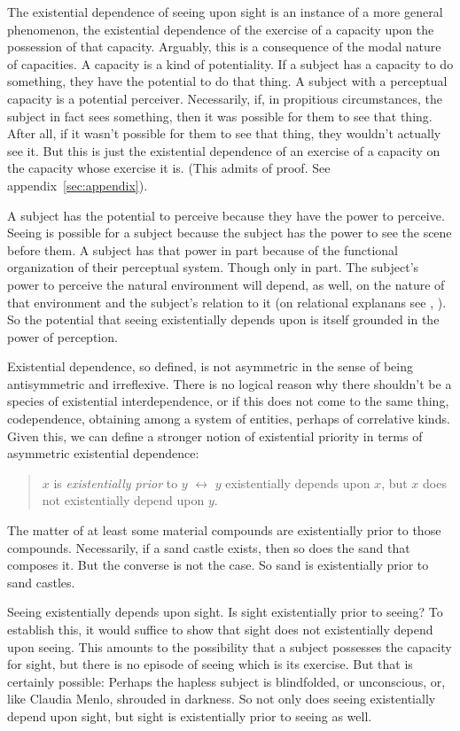 \documentclass[12pt]{article}
\begin{document}
The existential dependence of seeing upon sight is an instance of a more general phenomenon, the existential dependence of the exercise of a capacity upon the possession of that capacity. Arguably, this is a consequence of the modal nature of capacities. A capacity is a kind of potentiality. If a subject has a capacity to do something, they have the potential to do that thing. A subject with a perceptual capacity is a potential perceiver. Necessarily, if, in propitious circumstances, the subject in fact sees something, then it was possible for them to see that thing. After all, if it wasn't possible for them to see that thing, they wouldn't actually see it. But this is just the existential dependence of an exercise of a capacity on the capacity whose exercise it is. (This admits of proof. See appendix~\ref{sec:appendix}).

A subject has the potential to perceive because they have the power to perceive. Seeing is possible for a subject because the subject has the power to see the scene before them. A subject has that power in part because of the functional organization of their perceptual system. Though only in part. The subject's power to perceive the natural environment will depend, as well, on the nature of that environment and the subject's relation to it (on relational explanans see \citealt{Peacocke:1993kx}, \citealt{Williamson:2000lr}). So the potential that seeing existentially depends upon is itself grounded in the power of perception.

Existential dependence, so defined, is not asymmetric in the sense of being antisymmetric and irreflexive. There is no logical reason why there shouldn't be a species of existential interdependence, or if this does not come to the same thing, codependence, obtaining among a system of entities, perhaps of correlative kinds. Given this, we can define a stronger notion of existential priority in terms of asymmetric existential dependence:
\begin{quote}
    \( x \) is \emph{existentially prior} to \( y \) \( \leftrightarrow \) \( y \) existentially depends upon \( x \), but \( x \) does not existentially depend upon \( y \).
\end{quote}
The matter of at least some material compounds are existentially prior to those compounds. Necessarily, if a sand castle exists, then so does the sand that composes it. But the converse is not the case. So sand is existentially prior to sand castles.

Seeing existentially depends upon sight. Is sight existentially prior to seeing? To establish this, it would suffice to show that sight does not existentially depend upon seeing. This amounts to the possibility that a subject possesses the capacity for sight, but there is no episode of seeing which is its exercise. But that is certainly possible: Perhaps the hapless subject is blindfolded, or unconscious, or, like Claudia Menlo, shrouded in darkness. So not only does seeing existentially depend upon sight, but sight is existentially prior to seeing as well.
\end{document}
